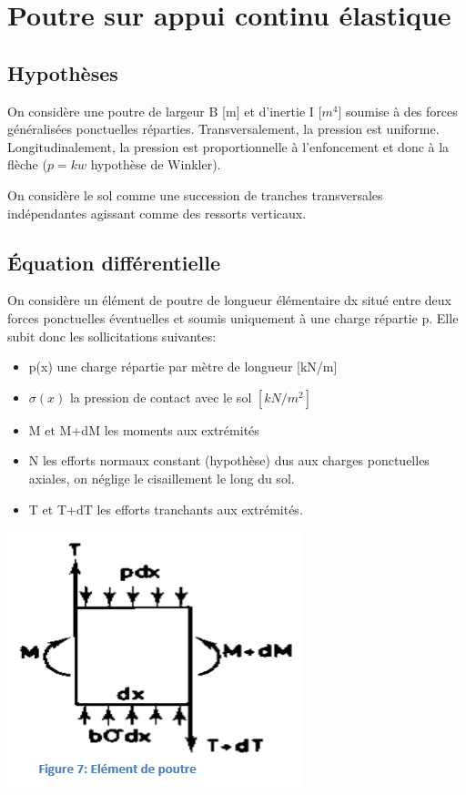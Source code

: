 \section{Poutre sur appui continu élastique}

\subsection{Hypothèses}

On considère une poutre de largeur B [m] et d'inertie I [$m^4$] soumise à des forces généralisées ponctuelles réparties. Transversalement, la pression est uniforme. Longitudinalement, la pression est proportionnelle à l'enfoncement et donc à la flèche ($p=kw$ hypothèse de Winkler). 

On considère le sol comme une succession de tranches transversales indépendantes agissant comme des ressorts verticaux.

\subsection{Équation différentielle}

On considère un élément de poutre de longueur élémentaire dx situé entre deux forces ponctuelles éventuelles et soumis uniquement à une charge répartie p. Elle subit donc les sollicitations suivantes:
\begin{itemize}
    \item p(x) une charge répartie par mètre de longueur [kN/m]
    \item $\sigma(x)$ la pression de contact avec le sol $[kN/m^2]$
    \item M et M+dM les moments aux extrémités
    \item N les efforts normaux constant (hypothèse) dus aux charges ponctuelles axiales, on néglige le cisaillement le long du sol.
    \item T et T+dT les efforts tranchants aux extrémités.
\end{itemize}

\begin{center}
\includegraphics [scale=0.5]{pictures/7.PNG}
\end{center}

